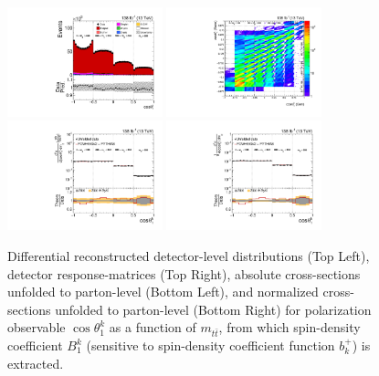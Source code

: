\clearpage
\begin{figure}[htb]
\begin{center}
 \includegraphics[width=0.40\textwidth]{fig_fullRun2UL/controlplots/combined/Hyp_AntiLeptonBk_vs_TTBarMass.pdf}
 \includegraphics[width=0.40\textwidth]{fig_fullRun2UL/unfolding/combined/ResponseMatrix_b1k_mttbar.pdf} \\
 \includegraphics[width=0.40\textwidth]{fig_fullRun2UL/unfolding/combined/UnfoldedResults_b1k_mttbar.pdf}
 \includegraphics[width=0.40\textwidth]{fig_fullRun2UL/unfolding/combined/UnfoldedResultsNorm_b1k_mttbar.pdf} \\
\label{fig:b1k_mttbar}
\caption{Differential reconstructed detector-level distributions (Top Left), detector response-matrices (Top Right), absolute cross-sections unfolded to parton-level (Bottom Left), and normalized cross-sections unfolded to parton-level (Bottom Right) for polarization observable $\cos\theta_{1}^{k}$ as a function of $m_{t\bar{t}}$, from which spin-density coefficient $B_{1}^{k}$ (sensitive to spin-density coefficient function $b_k^{+}$) is extracted.}
\end{center}
\end{figure}
